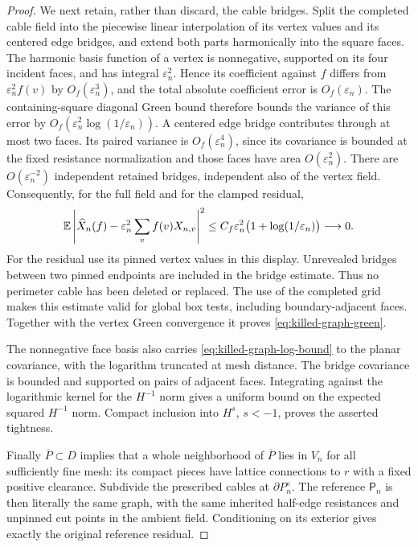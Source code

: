 \begin{proof}
We next retain, rather than discard, the cable bridges. Split the
completed cable field into the piecewise linear interpolation of its
vertex values and its centered edge bridges, and extend both parts
harmonically into the square faces. The harmonic basis function of a
vertex is nonnegative, supported on its four incident faces, and has
integral \(\varepsilon_n^2\). Hence its coefficient against \(f\)
differs from \(\varepsilon_n^2 f(v)\) by
\(O_f(\varepsilon_n^3)\), and the total absolute coefficient error is
\(O_f(\varepsilon_n)\). The containing-square diagonal Green bound
therefore bounds the variance of this error by
\(O_f(\varepsilon_n^2\log(1/\varepsilon_n))\).
A centered edge bridge contributes through at most two faces. Its
paired variance is \(O_f(\varepsilon_n^4)\), since its covariance is
bounded at the fixed resistance normalization and those faces have
area \(O(\varepsilon_n^2)\). There are
\(O(\varepsilon_n^{-2})\) independent retained bridges, independent
also of the vertex field. Consequently, for the full field and for
the clamped residual,
\begin{equation}
 \mathbb E\left|\widehat X_n(f)
       -\varepsilon_n^2\sum_v f(v)X_{n,v}\right|^2
 \le C_f\varepsilon_n^2
             \bigl(1+\log(1/\varepsilon_n)\bigr)\longrightarrow0.
 \label{eq:killed-graph-embedding}
\end{equation}
For the residual use its pinned vertex values in this display.
Unrevealed bridges between two pinned endpoints are included in the
bridge estimate. Thus no perimeter cable has been deleted or replaced.
The use of the completed grid makes this estimate valid for global
box tests, including boundary-adjacent faces. Together with the vertex
Green convergence it proves \eqref{eq:killed-graph-green}.

The nonnegative face basis also carries
\eqref{eq:killed-graph-log-bound} to the planar covariance, with the
logarithm truncated at mesh distance. The bridge covariance is bounded
and supported on pairs of adjacent faces. Integrating against the
logarithmic kernel for the \(H^{-1}\) norm gives a uniform bound on
the expected squared \(H^{-1}\) norm. Compact inclusion into
\(H^s\), \(s<-1\), proves the asserted tightness.

Finally \(\overline P\subset D\) implies that a whole neighborhood
of \(\overline P\) lies in \(V_n\) for all sufficiently fine mesh:
its compact pieces have lattice connections to \(r\) with a fixed
positive clearance. Subdivide the prescribed cables at
\(\partial P_n^\diamond\). The reference \(\mathsf P_n\) is then
literally the same graph, with the same inherited half-edge
resistances and unpinned cut points in the ambient field. Conditioning
on its exterior gives exactly the original reference residual.


\end{proof}
